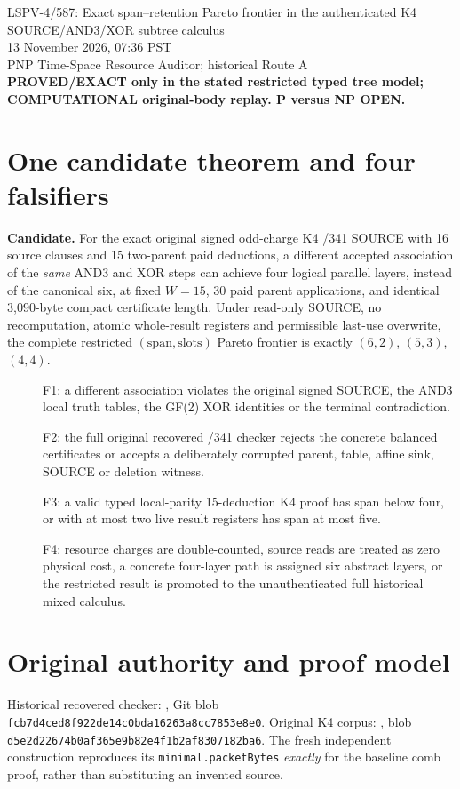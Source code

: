 \documentclass[11pt]{article}
\begin{document}
\begin{center}
{\Large LSPV-4/587: Exact span--retention Pareto frontier in the authenticated K4 SOURCE/AND3/XOR subtree calculus}\\[5pt]
13 November 2026, 07:36 PST\\
PNP Time-Space Resource Auditor; historical Route A\\
\textbf{PROVED/EXACT only in the stated restricted typed tree model; COMPUTATIONAL original-body replay. P versus NP OPEN.}
\end{center}

\section*{One candidate theorem and four falsifiers}
\noindent\textbf{Candidate.} For the exact original signed odd-charge K4 /341 SOURCE with 16 source clauses and 15 two-parent paid deductions, a different accepted association of the \emph{same} AND3 and XOR steps can achieve four logical parallel layers, instead of the canonical six, at fixed $W=15$, 30 paid parent applications, and identical 3,090-byte compact certificate length. Under read-only SOURCE, no recomputation, atomic whole-result registers and permissible last-use overwrite, the complete restricted $(\mathrm{span},\mathrm{slots})$ Pareto frontier is exactly $(6,2)$, $(5,3)$, $(4,4)$.

\begin{description}
\item[] F1: a different association violates the original signed SOURCE, the AND3 local truth tables, the GF(2) XOR identities or the terminal contradiction.
\item[] F2: the full original recovered /341 checker rejects the concrete balanced certificates or accepts a deliberately corrupted parent, table, affine sink, SOURCE or deletion witness.
\item[] F3: a valid typed local-parity 15-deduction K4 proof has span below four, or with at most two live result registers has span at most five.
\item[] F4: resource charges are double-counted, source reads are treated as zero physical cost, a concrete four-layer path is assigned six abstract layers, or the restricted result is promoted to the unauthenticated full historical mixed calculus.
\end{description}

\section*{Original authority and proof model}
\noindent Historical recovered checker: , Git blob
\texttt{fcb7d4ced8f922de14c0bda16263a8cc7853e8e0}.
Original K4 corpus:
,
blob \texttt{d5e2d22674b0af365e9b82e4f1b2af8307182ba6}.
The fresh independent construction reproduces its \texttt{minimal.packetBytes} \emph{exactly} for the baseline comb proof, rather than substituting an invented source.
\end{document}
